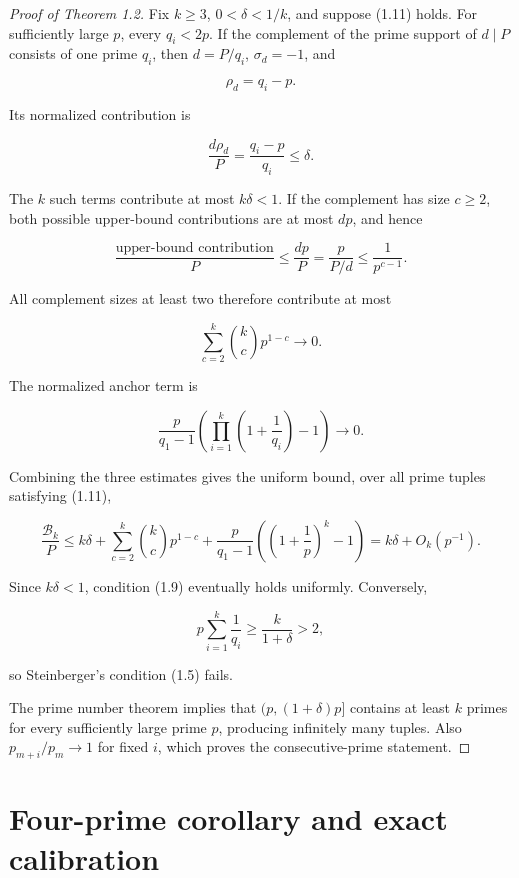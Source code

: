 \documentclass[11pt]{article}
\numberwithin{equation}{section}
\begin{document}
\begin{proof}[Proof of Theorem 1.2]

Fix \(k\geq3\), \(0<\delta<1/k\), and suppose (1.11) holds. For
sufficiently large \(p\), every \(q_i<2p\). If the complement of the
prime support of \(d\mid P\) consists of one prime \(q_i\), then
\(d=P/q_i\), \(\sigma_d=-1\), and

\nopagebreak[4]
\[
\rho_d=q_i-p.
\tag{6.1}
\]

Its normalized contribution is

\nopagebreak[4]
\[
\frac{d\rho_d}{P}
=\frac{q_i-p}{q_i}
\leq\delta.
\tag{6.2}
\]

The \(k\) such terms contribute at most \(k\delta<1\). If the complement
has size \(c\geq2\), both possible upper-bound contributions are at most
\(dp\), and hence

\nopagebreak[4]
\[
\frac{\text{upper-bound contribution}}P
\leq
\frac{dp}P
=\frac{p}{P/d}
\leq\frac1{p^{c-1}}.
\tag{6.3}
\]

All complement sizes at least two therefore contribute at most

\nopagebreak[4]
\[
\sum_{c=2}^k\binom{k}{c}p^{1-c}\longrightarrow0.
\tag{6.4}
\]

The normalized anchor term is

\nopagebreak[4]
\[
\frac{p}{q_1-1}
\left(
\prod_{i=1}^k\left(1+\frac1{q_i}\right)-1
\right)
\longrightarrow0.
\tag{6.5}
\]

Combining the three estimates gives the uniform bound, over all prime tuples
satisfying (1.11),

\nopagebreak[4]
\[
\frac{\mathcal B_k}{P}
\leq
k\delta+
\sum_{c=2}^k\binom{k}{c}p^{1-c}
+\frac{p}{q_1-1}
\left(\left(1+\frac1p\right)^k-1\right)
=k\delta+O_k(p^{-1}).
\tag{6.6}
\]

Since \(k\delta<1\), condition (1.9) eventually holds uniformly. Conversely,

\nopagebreak[4]
\[
p\sum_{i=1}^k\frac1{q_i}
\geq\frac{k}{1+\delta}>2,
\tag{6.7}
\]

so Steinberger's condition (1.5) fails.

The prime number theorem implies that
\((p,(1+\delta)p]\) contains at least \(k\) primes for every sufficiently
large prime \(p\), producing infinitely many tuples. Also
\(p_{m+i}/p_m\to1\) for fixed \(i\), which proves the consecutive-prime
statement.
\end{proof}


\section{Four-prime corollary and exact calibration}
\end{document}
